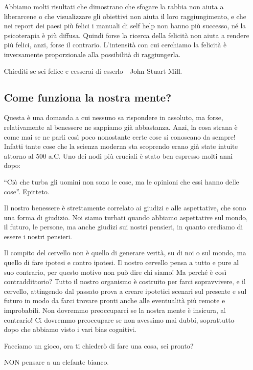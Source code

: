 \documentclass[12pt]{book} %
\begin{document}
Abbiamo molti risultati che dimostrano che sfogare la rabbia non aiuta a liberarcene o che visualizzare gli obiettivi
non aiuta il loro raggiungimento, e che nei report dei paesi più felici i manuali di self help non hanno più successo,
né la psicoterapia è più diffusa. Quindi forse la ricerca della felicità non aiuta a rendere più felici, anzi, forse il
contrario. L'intensità con cui cerchiamo la felicità è inversamente proporzionale alla possibilità
di raggiungerla. 


\bigskip

Chiediti se sei felice e cesserai di esserlo - John Stuart Mill.

\subsection{Come funziona la nostra mente?}
Questa è una domanda a cui nessuno sa rispondere in assoluto, ma forse, relativamente al benessere ne sappiamo già
abbastanza. Anzi, la cosa strana è come mai se ne parli così poco nonostante certe cose si conoscano da sempre! Infatti
tante cose che la scienza moderna sta scoprendo erano già state intuite attorno al 500 a.C. Uno dei nodi più cruciali è
stato ben espresso molti anni dopo:

“Ciò che turba gli uomini non sono le cose, ma le opinioni che essi hanno delle cose”. Epitteto.

Il nostro benessere è strettamente correlato ai giudizi e alle aspettative, che sono una forma di giudizio. Noi siamo
turbati quando abbiamo aspettative sul mondo, il futuro, le persone, ma anche giudizi sui nostri pensieri, in quanto
crediamo di essere i nostri pensieri.

Il compito del cervello non è quello di generare verità, su di noi o sul mondo, ma quello di fare ipotesi e contro
ipotesi. Il nostro cervello pensa a tutto e pure al suo contrario, per questo motivo non può dire chi siamo! Ma perché
è così contraddittorio? Tutto il nostro organismo è costruito per farci sopravvivere, e il cervello, attingendo dal
passato prova a creare ipotetici scenari sul presente e sul futuro in modo da farci trovare pronti anche alle
eventualità più remote e improbabili. Non dovremmo preoccuparci se la nostra mente è insicura, al contrario! Ci
dovremmo preoccupare se non avessimo mai dubbi, soprattutto dopo che abbiamo visto i vari bias cognitivi. 

Facciamo un gioco, ora ti chiederò di fare una cosa, sei pronto?

NON pensare a un elefante bianco. 
\end{document}
